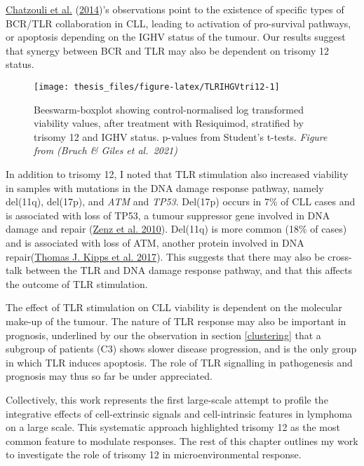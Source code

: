 \documentclass[11pt, a4paper, twosided]{book}
\begin{document}
\protect\hyperlink{ref-Chatzouli2014}{Chatzouli et al.} (\protect\hyperlink{ref-Chatzouli2014}{2014})'s observations point to the existence of specific types of BCR/TLR collaboration in CLL, leading to activation of pro-survival pathways, or apoptosis depending on the IGHV status of the tumour. Our results suggest that synergy between BCR and TLR may also be dependent on trisomy 12 status.


\begin{figure}

{\centering \texttt{[image: thesis\_files/figure-latex/TLRIHGVtri12-1]} 

}

\caption{Beeswarm-boxplot showing control-normalised log transformed viability values, after treatment with Resiquimod, stratified by trisomy 12 and IGHV status. p-values from Student's t-tests. \emph{Figure from (Bruch \& Giles et al.~2021)}}\label{fig:TLRIHGVtri12}
\end{figure}
In addition to trisomy 12, I noted that TLR stimulation also increased viability in samples with mutations in the DNA damage response pathway, namely del(11q), del(17p), and \emph{ATM} and \emph{TP53}. Del(17p) occurs in 7\% of CLL cases and is associated with loss of TP53, a tumour suppressor gene involved in DNA damage and repair (\protect\hyperlink{ref-Zenz2010}{Zenz et al. 2010}). Del(11q) is more common (18\% of cases) and is associated with loss of ATM, another protein involved in DNA repair(\protect\hyperlink{ref-Kipps2017}{Thomas J. Kipps et al. 2017}). This suggests that there may also be cross-talk between the TLR and DNA damage response pathway, and that this affects the outcome of TLR stimulation.

The effect of TLR stimulation on CLL viability is dependent on the molecular make-up of the tumour. The nature of TLR response may also be important in prognosis, underlined by our the observation in section \ref{clustering} that a subgroup of patients (C3) shows slower disease progression, and is the only group in which TLR induces apoptosis. The role of TLR signalling in pathogenesis and prognosis may thus so far be under appreciated.

Collectively, this work represents the first large-scale attempt to profile the integrative effects of cell-extrinsic signals and cell-intrinsic features in lymphoma on a large scale. This systematic approach highlighted trisomy 12 as the most common feature to modulate responses. The rest of this chapter outlines my work to investigate the role of trisomy 12 in microenvironmental response.
\end{document}
